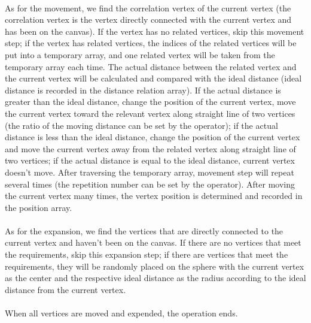 \documentclass[runningheads]{llncs}
\begin{document}
\paragraph{}
As for the movement, we find the correlation vertex of the current vertex (the correlation vertex is the vertex directly connected with the current vertex and has been on the canvas). If the vertex has no related vertices, skip this movement step; if the vertex has related vertices, the indices of the related vertices will be put into a temporary array, and one related vertex will be taken from the temporary array each time. The actual distance between the related vertex and the current vertex will be calculated and compared with the ideal distance (ideal distance is recorded in the distance relation array). If the actual distance is greater than the ideal distance, change the position of the current vertex, move the current vertex toward the relevant vertex along straight line of two vertices (the ratio of the moving distance can be set by the operator); if the actual distance is less than the ideal distance, change the position of the current vertex and move the current vertex away from the related vertex along straight line of two vertices; if the actual distance is equal to the ideal distance, current vertex doesn't move. After traversing the temporary array, movement step will repeat several times (the repetition number can be set by the operator). After moving the current vertex many times, the vertex position is determined and recorded in the position array.
\paragraph{}
As for the expansion, we find the vertices that are directly connected to the current vertex and haven't been on the canvas. If there are no vertices that meet the requirements, skip this expansion step; if there are vertices that meet the requirements, they will be randomly placed on the sphere with the current vertex as the center and the respective ideal distance as the radius according to the ideal distance from the current vertex.
\paragraph{}
When all vertices are moved and expended, the operation ends.
\end{document}
